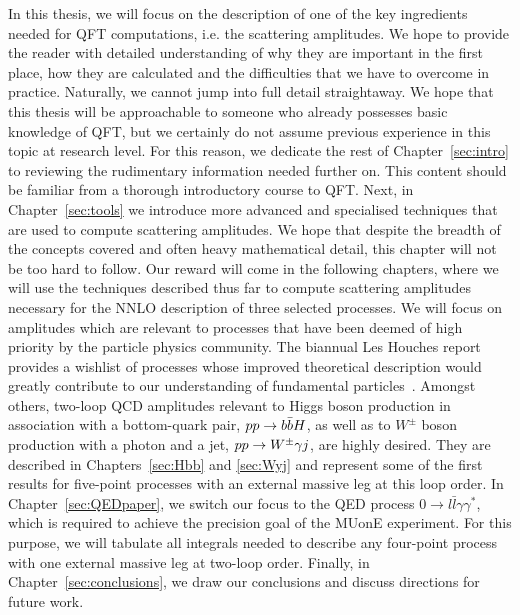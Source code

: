 \documentclass[main.tex]{subfiles}
\begin{document}
In this thesis, we will focus on the description of one of the key ingredients needed for QFT computations, i.e. the scattering amplitudes. We hope to provide the reader with detailed understanding of why they are important in the first place, how they are calculated and the difficulties that we have to overcome in practice. Naturally, we cannot jump into full detail straightaway. We hope that this thesis will be approachable to someone who already possesses basic knowledge of QFT, but we certainly do not assume previous experience in this topic at research level. For this reason, we dedicate the rest of Chapter~\ref{sec:intro} to reviewing the rudimentary information needed further on. This content should be familiar from a thorough introductory course to QFT. Next, in Chapter~\ref{sec:tools} we introduce more advanced and specialised techniques that are used to compute scattering amplitudes. We hope that despite the breadth of the concepts covered and often heavy mathematical detail, this chapter will not be too hard to follow. Our reward will come in the following chapters, where we will use the techniques described thus far to compute scattering amplitudes necessary for the NNLO description of three selected processes. We will focus on amplitudes which are relevant to processes that have been deemed of high priority by the particle physics community. The biannual Les Houches report provides a wishlist of processes whose improved theoretical description would greatly contribute to our understanding of fundamental particles~\cite{Huss:2022ful}. Amongst others, two-loop QCD amplitudes relevant to Higgs boson production in association with a bottom-quark pair, $pp \rightarrow b\bar{b}H$, as well as to $W^\pm$ boson production with a photon and a jet, $pp \rightarrow W^\pm \gamma j$, are highly desired. They are described in Chapters~\ref{sec:Hbb} and \ref{sec:Wyj} and represent some of the first results for five-point processes with an external massive leg at this loop order. In Chapter~\ref{sec:QEDpaper}, we switch our focus to the QED process $0 \to l \bar{l} \gamma \gamma^\ast$, which is required to achieve the precision goal of the MUonE experiment. For this purpose, we will tabulate all integrals needed to describe any four-point process with one external massive leg at two-loop order. Finally, in Chapter~\ref{sec:conclusions}, we draw our conclusions and discuss directions for future work.
\end{document}
